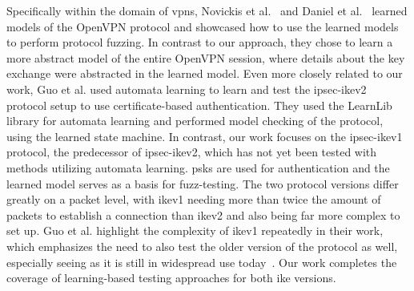 Specifically within the domain of \acp{vpn}, Novickis et al.~\cite{novickis2016protocol} and Daniel et al.~\cite{daniel2018inferring} learned models of the OpenVPN protocol and showcased how to use the learned models to perform protocol fuzzing. In contrast to our approach, they chose to learn a more abstract model of the entire OpenVPN session, where details about the key exchange were abstracted in the learned model. 
Even more closely related to our work, Guo et al. \cite{guo2019model} used automata learning to learn and test the \ac{ipsec}-\ac{ike}v2 protocol setup to use certificate-based authentication. They used the LearnLib~\cite{software:learnlib} library for automata learning and performed model checking of the protocol, using the learned state machine. In contrast, our work focuses on the \ac{ipsec}-\ac{ike}v1 protocol, the predecessor of \ac{ipsec}-\ac{ike}v2, which has not yet been tested with methods utilizing automata learning. \Acp{psk} are used for authentication and the learned model serves as a basis for fuzz-testing. The two protocol versions differ greatly on a packet level, with \ac{ike}v1 needing more than twice the amount of packets to establish a connection than \ac{ike}v2 and also being far more complex to set up.  Guo et al. highlight the complexity of \ac{ike}v1 repeatedly in their work, which emphasizes the need to also test the older version of the protocol as well, especially seeing as it is still in widespread use today~\cite{avm2022}. Our work completes the coverage of learning-based testing approaches for both \ac{ike} versions.
